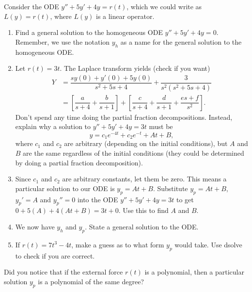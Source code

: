 \begin{problem}
Consider the ODE $y''+5y'+4y=r(t)$, which we could write as $L(y)=r(t)$, where $L(y)$ is a linear operator. 
\begin{enumerate}
 \item Find a general solution to the homogeneous ODE $y''+5y'+4y=0$. Remember, we use the notation $y_h$ as a name for the general solution to the homogeneous ODE. 
 \item Let $r(t)=3t$. The Laplace transform yields (check if you want)
\begin{align*}
Y
&=
\dfrac{sy(0)+y'(0)+5y(0)}{s^2+5s+4}
+\dfrac{3}{s^2(s^2+5s+4)}
\\
&=
\left[\dfrac{a}{s+4}+
\dfrac{b}{s+1}\right]+
\left[\dfrac{c}{s+4}+
\dfrac{d}{s+1}+
\dfrac{es+f}{s^2}
\right].
\end{align*}
Don't spend any time doing the partial fraction decompositions.  Instead, 
 explain why a solution to $y''+5y'+4y=3t$ must be $$y=c_1 e^{-4t}+c_2e^{-t}+At+B,$$ where $c_1$ and $c_2$ are arbitrary (depending on the initial conditions), but $A$ and $B$ are the same regardless of the initial conditions (they could be determined by doing a partial fraction decomposition).
 \item Since $c_1$ and $c_2$ are arbitrary constants, let them be zero. This means a particular solution to our ODE is $y_p=At+B$.  Substitute $y_p=At+B$, $y_p'=A$ and $y_p''=0$ into the ODE $y''+5y'+4y=3t$ to get $0+5(A)+4(At+B)=3t+0$.  Use this to find $A$ and $B$.
 \item We now have $y_h$ and $y_p$. State a general solution to the ODE.
 \item If $r(t) = 7t^3-4t$, make a guess as to what form $y_p$ would take. 
Use dsolve to check if you are correct. 
\end{enumerate}

\end{problem}
Did you notice that if the external force $r(t)$ is a polynomial, then a particular solution $y_p$ is a polynomial of the same degree?










